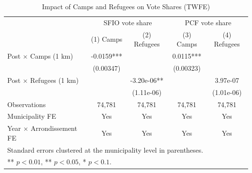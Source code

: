 \begin{table}[h!]
\centering
\caption{Impact of Camps and Refugees on Vote Shares (TWFE)}
\label{tab:twfe_camps_refugees}
\begin{tabular}{lcccc}
\hline
 & \multicolumn{2}{c}{SFIO vote share} & \multicolumn{2}{c}{PCF vote share} \\
 & (1) Camps & (2) Refugees & (3) Camps & (4) Refugees \\
\hline

Post $\times$ Camps (1 km) 
& -0.0159*** &  & 0.0115*** &  \\
 & (0.00347) &  & (0.00323) &  \\

Post $\times$ Refugees (1 km) 
&  & -3.20e-06** &  & 3.97e-07 \\
 &  & (1.11e-06) &  & (1.01e-06) \\

\hline
Observations & 74,781 & 74,781 & 74,781 & 74,781 \\
Municipality FE & Yes & Yes & Yes & Yes \\
Year $\times$ Arrondissement FE & Yes & Yes & Yes & Yes \\
\hline
\multicolumn{5}{l}{\footnotesize Standard errors clustered at the municipality level in parentheses.} \\
\multicolumn{5}{l}{\footnotesize *** $p<0.01$, ** $p<0.05$, * $p<0.1$.}
\end{tabular}
\end{table}